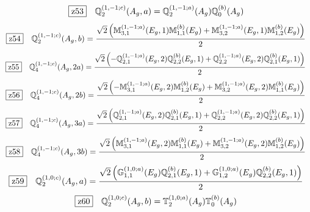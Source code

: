 \documentclass[fleqn,10pt,landscape]{jsarticle}
\begin{document}
\begin{dmath*}
\hspace*{3mm}\fbox{z53}\quad \mathbb{Q}_{2}^{(1,-1;c)}(A_{g},a)=\mathbb{Q}_{2}^{(1,-1;a)}(A_{g}) \mathbb{Q}_{0}^{(b)}(A_{g})
\end{dmath*}
\begin{dmath*}
\hspace*{3mm}\fbox{z54}\quad \mathbb{Q}_{2}^{(1,-1;c)}(A_{g},b)=\frac{\sqrt{2} \left(\mathbb{M}_{3,1}^{(1,-1;a)}(E_{g},1) \mathbb{M}_{1,1}^{(b)}(E_{g}) + \mathbb{M}_{3,2}^{(1,-1;a)}(E_{g},1) \mathbb{M}_{1,2}^{(b)}(E_{g})\right)}{2}
\end{dmath*}
\begin{dmath*}
\hspace*{3mm}\fbox{z55}\quad \mathbb{Q}_{4}^{(1,-1;c)}(A_{g},2a)=\frac{\sqrt{2} \left(- \mathbb{Q}_{2,1}^{(1,-1;a)}(E_{g},2) \mathbb{Q}_{2,2}^{(b)}(E_{g},1) + \mathbb{Q}_{2,2}^{(1,-1;a)}(E_{g},2) \mathbb{Q}_{2,1}^{(b)}(E_{g},1)\right)}{2}
\end{dmath*}
\begin{dmath*}
\hspace*{3mm}\fbox{z56}\quad \mathbb{Q}_{4}^{(1,-1;c)}(A_{g},2b)=\frac{\sqrt{2} \left(- \mathbb{M}_{3,1}^{(1,-1;a)}(E_{g},2) \mathbb{M}_{1,2}^{(b)}(E_{g}) + \mathbb{M}_{3,2}^{(1,-1;a)}(E_{g},2) \mathbb{M}_{1,1}^{(b)}(E_{g})\right)}{2}
\end{dmath*}
\begin{dmath*}
\hspace*{3mm}\fbox{z57}\quad \mathbb{Q}_{4}^{(1,-1;c)}(A_{g},3a)=\frac{\sqrt{2} \left(\mathbb{Q}_{2,1}^{(1,-1;a)}(E_{g},2) \mathbb{Q}_{2,1}^{(b)}(E_{g},1) + \mathbb{Q}_{2,2}^{(1,-1;a)}(E_{g},2) \mathbb{Q}_{2,2}^{(b)}(E_{g},1)\right)}{2}
\end{dmath*}
\begin{dmath*}
\hspace*{3mm}\fbox{z58}\quad \mathbb{Q}_{4}^{(1,-1;c)}(A_{g},3b)=\frac{\sqrt{2} \left(\mathbb{M}_{3,1}^{(1,-1;a)}(E_{g},2) \mathbb{M}_{1,1}^{(b)}(E_{g}) + \mathbb{M}_{3,2}^{(1,-1;a)}(E_{g},2) \mathbb{M}_{1,2}^{(b)}(E_{g})\right)}{2}
\end{dmath*}
\begin{dmath*}
\hspace*{3mm}\fbox{z59}\quad \mathbb{Q}_{2}^{(1,0;c)}(A_{g},a)=\frac{\sqrt{2} \left(\mathbb{G}_{1,1}^{(1,0;a)}(E_{g}) \mathbb{Q}_{2,1}^{(b)}(E_{g},1) + \mathbb{G}_{1,2}^{(1,0;a)}(E_{g}) \mathbb{Q}_{2,2}^{(b)}(E_{g},1)\right)}{2}
\end{dmath*}
\begin{dmath*}
\hspace*{3mm}\fbox{z60}\quad \mathbb{Q}_{2}^{(1,0;c)}(A_{g},b)=\mathbb{T}_{2}^{(1,0;a)}(A_{g}) \mathbb{T}_{0}^{(b)}(A_{g})
\end{dmath*}
\end{document}
